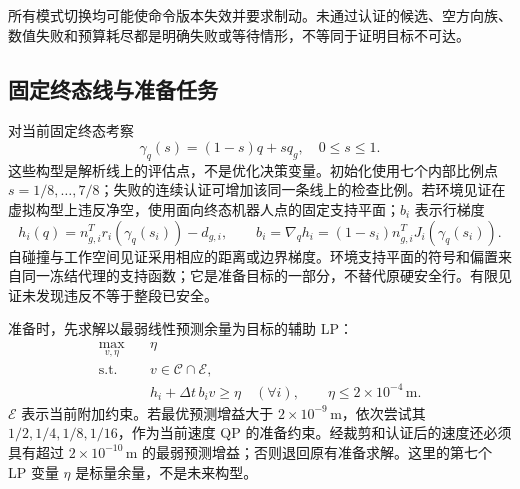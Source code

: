 所有模式切换均可能使命令版本失效并要求制动。未通过认证的候选、空方向族、数值失败和预算耗尽都是明确失败或等待情形，不等同于证明目标不可达。

\subsection{固定终态线与准备任务}
对当前固定终态考察
\begin{equation}
 \gamma_q(s)=(1-s)q+s q_g,\quad 0\le s\le1.\tag{M5}
\end{equation}
这些构型是解析线上的评估点，不是优化决策变量。初始化使用七个内部比例点 $s=1/8,\ldots,7/8$；失败的连续认证可增加该同一条线上的检查比例。若环境见证在虚拟构型上违反净空，使用面向终态机器人点的固定支持平面；$b_i$ 表示行梯度
\begin{equation}
 h_i(q)=n_{g,i}^T r_i(\gamma_q(s_i))-d_{g,i},\qquad
 b_i=\nabla_q h_i=(1-s_i)n_{g,i}^T J_i(\gamma_q(s_i)).\tag{M6}
\end{equation}
自碰撞与工作空间见证采用相应的距离或边界梯度。环境支持平面的符号和偏置来自同一冻结代理的支持函数；它是准备目标的一部分，不替代原硬安全行。有限见证未发现违反不等于整段已安全。

准备时，先求解以最弱线性预测余量为目标的辅助 LP：
\begin{equation}
\begin{aligned}
 \max_{v,\eta}\quad&\eta\\
 \mathrm{s.t.}\quad&v\in\mathcal C\cap\mathcal E,\\
 &h_i+\Delta t\,b_i v\ge\eta\quad(\forall i),\qquad \eta\le2\times10^{-4}\,\mathrm m.
\end{aligned}\tag{M7}
\end{equation}
$\mathcal E$ 表示当前附加约束。若最优预测增益大于 $2\times10^{-9}\,\mathrm m$，依次尝试其 $1/2,1/4,1/8,1/16$，作为当前速度 QP 的准备约束。经裁剪和认证后的速度还必须具有超过 $2\times10^{-10}\,\mathrm m$ 的最弱预测增益；否则退回原有准备求解。这里的第七个 LP 变量 $\eta$ 是标量余量，不是未来构型。

